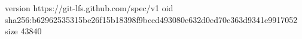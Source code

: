 version https://git-lfs.github.com/spec/v1
oid sha256:b62962535315be26f15b18398f9bccd493080e632d0ed70c363d9341e9917052
size 43840
